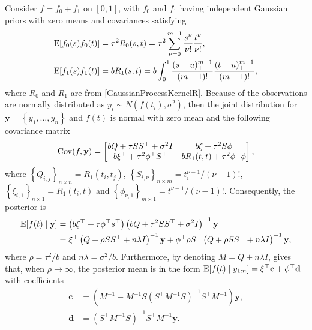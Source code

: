 Consider $f=f_0+f_1$ on $[0,1]$, with $f_0$ and $f_1$ having independent Gaussian priors with zero means and covariances satisfying  
\begin{align}
\mathrm{E} \lbrack f_0(s)f_0(t)\rbrack  &= \tau^2 R_0(s,t)=\tau^2 \sum_{\nu=0}^{m-1}\frac{s^\nu}{\nu!}\frac{t^\nu}{\nu!},\label{Ef0f0} \\
\mathrm{E} \lbrack f_1(s)f_1(t) \rbrack &= bR_1(s,t) = b\int_{0}^{1} \frac{(s-u)_+^{m-1}}{(m-1)!} \frac{(t-u)_+^{m-1}}{(m-1)!},\label{Ef1f1}
\end{align}
where $R_0$ and $R_1$ are from \eqref{GaussianProcessKernelR}. Because of the observations are normally distributed as $y_i\sim N(f(t_i),\sigma^2)$, then the joint distribution for $\mathbf{y} = \left\lbrace y_1,\ldots,y_n\right\rbrace$ and $f(t)$ is normal with zero mean and the following covariance matrix 
\begin{align*}\mathrm{Cov} (f,\mathbf{y}) = 
\begin{bmatrix}
bQ+\tau SS^\top+\sigma^2 I & b\xi +\tau^2 S\phi \\
b\xi^\top + \tau^2\phi^\top S^\top & bR_1(t,t) +\tau^2\phi^\top \phi
\end{bmatrix},
\end{align*}
where $\left\lbrace Q_{i,j}\right\rbrace_{n\times n}=R_1(t_i,t_j)$, $\left\lbrace S_{i,\nu}\right\rbrace_{n\times m}=t_i^{\nu-1}/(\nu-1)!$, $\left\lbrace \xi_{i,1}\right\rbrace_{n\times 1}=R_1(t_i,t)$ and $\left\lbrace \phi_{\nu,1}\right\rbrace_{m\times 1}=t^{\nu-1}/(\nu-1)!$. 
Consequently, the posterior is 
\begin{equation}
\begin{split}
\mathrm{E} \lbrack f(t)\mid\mathbf{y}\rbrack &= \left(b\xi^\top +\tau \phi^\top s^\top\right)\left(bQ+\tau^2 SS^\top+\sigma^2I\right)^{-1}\mathbf{y} \\
&= \xi^\top\left(Q+\rho SS^\top+n\lambda I\right)^{-1}\mathbf{y}+ \phi^\top\rho S^\top\left(Q+\rho SS^\top +n\lambda I\right)^{-1}\mathbf{y},
\end{split}
\end{equation}
where $\rho = \tau^2/b$ and $n\lambda=\sigma^2/b$. Furthermore, by denoting $M=Q+n\lambda I$, \cite{gu2013smoothing} gives that, when $\rho\rightarrow \infty$, the posterior mean is in the form $\mathrm{E}\lbrack f(t)\mid y_{1:n}\rbrack = \xi^\top\mathbf{c}+\phi^\top\mathbf{d}$ with coefficients
\begin{align}
\mathbf{c}&=\left(M^{-1}-M^{-1}S\left(S^\top M^{-1}S\right)^{-1}S^\top M^{-1}\right)\mathbf{y},\\
\mathbf{d}&=\left(S^\top M^{-1}S\right)^{-1}S^\top M^{-1}\mathbf{y}.
\end{align}

